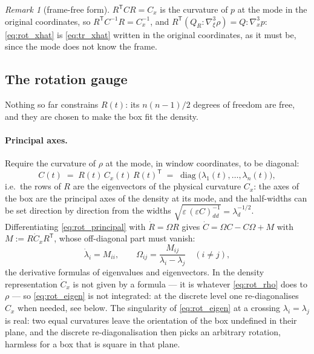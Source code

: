 \documentclass[11pt,a4paper]{article}
\newcommand{\T}{^{\mathsf T}}
\newcommand{\eps}{\varepsilon}
\newcommand{\grad}{\nabla}
\theoremstyle{plain}
\theoremstyle{definition}
\theoremstyle{remark}
\newtheorem{remark}{Remark}
\begin{document}
\begin{remark}[frame-free form]
$R\T CR = C_x$ is the curvature of $p$ at the mode in the original coordinates, so $R\T C^{-1}R = C_x^{-1}$, and $R\T(Q_R\!:\!\grad^3_\xi\rho) = Q\!:\!\grad^3_xp$: \eqref{eq:rot_xhat} is \eqref{eq:tr_xhat} written in the original coordinates, as it must be, since the mode does not know the frame.
\end{remark}

\subsection{The rotation gauge}

Nothing so far constrains $R(t)$: its $n(n-1)/2$ degrees of freedom are free, and they are chosen to make the box fit the density.

\paragraph{Principal axes.}
Require the curvature of $\rho$ at the mode, in window coordinates, to be diagonal:
\begin{equation}
  C(t) \;=\; R(t)\,C_x(t)\,R(t)\T \;=\; \operatorname{diag}\big(\lambda_1(t),\dots,\lambda_n(t)\big),
  \label{eq:rot_principal}
\end{equation}
i.e.\ the rows of $R$ are the eigenvectors of the physical curvature $C_x$: the axes of the box are the principal axes of the density at its mode, and the half-widths can be set direction by direction from the widths $\sqrt{\eps\,(\eps C)^{-1}_{dd}}=\lambda_d^{-1/2}$. Differentiating \eqref{eq:rot_principal} with $\dot R=\Omega R$ gives $\dot C = \Omega C - C\Omega + M$ with $M:=R\dot C_xR\T$, whose off-diagonal part must vanish:
\begin{equation}
  \dot\lambda_i = M_{ii}, \qquad \Omega_{ij} = \frac{M_{ij}}{\lambda_i-\lambda_j}\quad(i\ne j),
  \label{eq:rot_eigen}
\end{equation}
the derivative formulas of eigenvalues and eigenvectors. In the density representation $\dot C_x$ is not given by a formula --- it is whatever \eqref{eq:rot_rho} does to $\rho$ --- so \eqref{eq:rot_eigen} is not integrated: at the discrete level one re-diagonalises $C_x$ when needed, see below. The singularity of \eqref{eq:rot_eigen} at a crossing $\lambda_i=\lambda_j$ is real: two equal curvatures leave the orientation of the box undefined in their plane, and the discrete re-diagonalisation then picks an arbitrary rotation, harmless for a box that is square in that plane.
\end{document}
